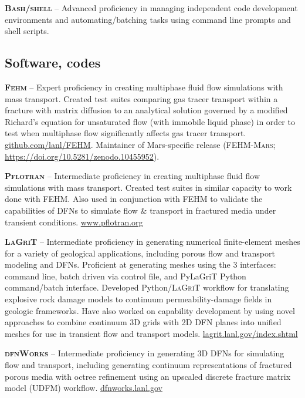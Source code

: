 \documentclass[11pt, letterpaper]{article}
\begin{document}
\textbf{\textsc{Bash/shell}} -- Advanced proficiency in managing independent
code development environments and automating/batching tasks using command
line prompts and shell scripts. 


\subsection*{Software, codes}
\noindent
\textbf{\textsc{Fehm}} -- Expert proficiency in creating multiphase fluid
flow simulations with mass transport. Created test suites comparing gas
tracer transport within a fracture with matrix diffusion to an analytical
solution governed by a modified Richard's equation for unsaturated flow (with
immobile liquid phase) in order to test when multiphase flow significantly
affects gas tracer transport.
\href{https://github.com/lanl/FEHM}{github.com/lanl/FEHM}. Maintainer of
Mars-specific release (\textsc{FEHM-Mars};
\href{https://doi.org/10.5281/zenodo.10455952}{https://doi.org/10.5281/zenodo.10455952}).

\textbf{\textsc{Pflotran}} -- Intermediate proficiency in creating multiphase
fluid flow simulations with mass transport. Created test suites in similar
capacity to work done with FEHM. Also used in conjunction with FEHM to validate
the capabilities of DFNs to simulate
flow \& transport in fractured media under transient conditions.
\href{https://www.pflotran.org}{www.pflotran.org} 

\textbf{\textsc{LaGriT}} -- Intermediate proficiency in generating numerical
finite-element meshes for a variety of geological applications, including
porous flow and transport modeling and DFNs. Proficient at generating meshes
using the 3 interfaces: command line, batch driven via control file, and
PyLaGriT Python command/batch interface. Developed Python/\textsc{LaGriT}
workflow for translating explosive rock damage models to continuum
permeability-damage fields in geologic frameworks. Have also worked on
capability development by using novel approaches to combine continuum 3D grids
with 2D DFN planes into unified meshes for use in transient flow and transport
models.
\href{https://lagrit.lanl.gov/index.shtml}{lagrit.lanl.gov/index.shtml}

\textbf{\textsc{dfnWorks}} -- Intermediate proficiency in generating 3D
DFNs for simulating flow and transport, including
generating continuum representations of fractured porous media with octree
refinement using an upscaled discrete fracture matrix model (UDFM) workflow.
\href{https://dfnworks.lanl.gov}{dfnworks.lanl.gov}
\end{document}
